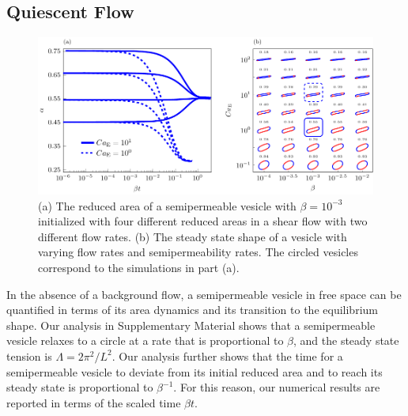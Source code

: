 \documentclass[9pt,twocolumn,twoside,lineno]{pnas-new}
\newif\ifTikz
\begin{document}
\subsection*{Quiescent Flow} 
\begin{figure}[htp]
  \centering
  \ifTikz
  
  \else
  \includegraphics{figures/shearComposite.pdf}
  \fi
  \caption{\label{fig:shearComposite} (a) The reduced area of a
  semipermeable vesicle with $\beta = 10^{-3}$ initialized with four
  different reduced areas in a shear flow with two different flow rates.
  (b) The steady state shape of a vesicle with varying flow rates and
  semipermeability rates. The circled vesicles correspond to the
  simulations in part (a).}
\end{figure}
In the absence of a background flow, a semipermeable vesicle in free
space can be quantified in terms of its area dynamics and its transition
to the equilibrium shape. Our analysis in Supplementary Material shows
that a semipermeable vesicle relaxes to a circle at a rate that is
proportional to $\beta$, and the steady state tension is $\Lambda =
2\pi^2/L^2$. Our analysis further shows that the time for a
semipermeable vesicle to deviate from its initial reduced area and to
reach its steady state is proportional to $\beta^{-1}$. For this reason,
our numerical results are reported in terms of the scaled time $\beta
t$.
\end{document}
